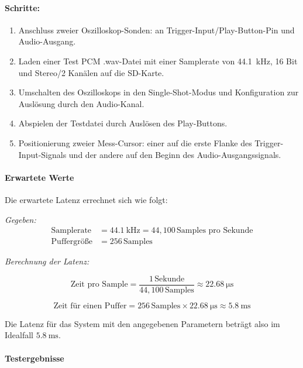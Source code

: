 \begin{minipage}{\textwidth}
\paragraph{Schritte:}
\begin{enumerate}
	\item Anschluss zweier Oszilloskop-Sonden: an Trigger-Input/Play-Button-Pin und Audio-Ausgang.
	\item Laden einer Test PCM .wav-Datei mit einer Samplerate von \SI{44.1}{\kilo\hertz}, 16 Bit und Stereo/2 Kanälen auf die SD-Karte.
	\item Umschalten des Oszilloskops in den Single-Shot-Modus und Konfiguration zur Auslösung durch den Audio-Kanal.
	\item Abspielen der Testdatei durch Auslösen des Play-Buttons.
	\item Positionierung zweier Mess-Cursor: einer auf die erste Flanke des Trigger-Input-Signals und der andere auf den Beginn des Audio-Ausgangssignals.
\end{enumerate}
\end{minipage}


\paragraph{Erwartete Werte}
	Die erwartete Latenz errechnet sich wie folgt:
	
	\textit{Gegeben:}
	\begin{align*}
		\text{Samplerate} &= \SI{44.1}{\kilo\hertz} = 44{,}100 \, \text{Samples pro Sekunde} \\
		\text{Puffergröße} &= 256 \, \text{Samples}
	\end{align*}
	
	\textit{Berechnung der Latenz:}
	
	\[
	\text{Zeit pro Sample} = \frac{1 \, \text{Sekunde}}{44{,}100 \, \text{Samples}} \approx \SI{22.68}{\micro\second}
	\]
	
	\[
	\text{Zeit für einen Puffer} = 256 \, \text{Samples} \times \SI{22.68}{\micro\second} \approx \SI{5.8}{\milli\second}
	\]
	
	Die Latenz für das System mit den angegebenen Parametern beträgt also im Idealfall \( \SI{5.8}{\milli\second} \).
	
\paragraph{Testergebnisse}

